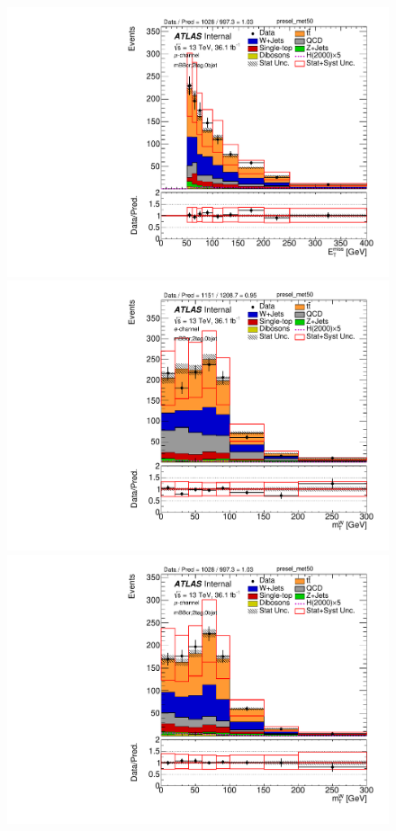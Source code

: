 \begin{figure}[!h]
\begin{center}
\includegraphics[scale=0.33]{./figures/boosted/PlotByChannels/DataMC_2tag_0bjet_mbbcr_muon_presel_met50_MET}                                                                                        
\includegraphics[scale=0.33]{./figures/boosted/PlotByChannels/DataMC_2tag_0bjet_mbbcr_elec_presel_met50_WlepMtATLAS}                                                                                
\includegraphics[scale=0.33]{./figures/boosted/PlotByChannels/DataMC_2tag_0bjet_mbbcr_muon_presel_met50_WlepMtATLAS}                                                                                

\end{center}
\end{figure}
